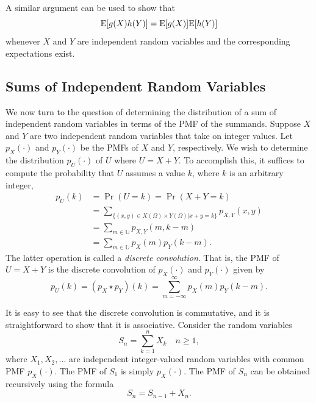 A similar argument can be used to show that
\begin{equation} \label{equation:DiscreteProduct}
\mathrm{E}[ g(X) h(Y) ] = \mathrm{E} [ g(X) ] \mathrm{E} [ h(Y) ]
\end{equation}
whenever $X$ and $Y$ are independent random variables and the corresponding expectations exist.


\subsection{Sums of Independent Random Variables}

We now turn to the question of determining the distribution of a sum of independent random variables in terms of the PMF of the summands.
Suppose $X$ and $Y$ are two independent random variables that take on integer values.
Let $p_X(\cdot)$ and $p_Y(\cdot)$ be the PMFs of $X$ and $Y$, respectively.
We wish to determine the distribution $p_U (\cdot)$ of $U$ where $U = X + Y$.
To accomplish this, it suffices to compute the probability that $U$ assumes a value $k$, where $k$ is an arbitrary integer,
\begin{equation*}
\begin{split}
p_U (k) &= \Pr (U = k) = \Pr (X + Y = k) \\
&= \sum_{ \{ (x,y) \in X(\Omega) \times Y(\Omega) | x + y = k \} } p_{X,Y} (x, y) \\
&= \sum_{ m \in \mathbb{U} } p_{X,Y} (m, k-m) \\
&= \sum_{ m \in \mathbb{U} } p_X (m) p_Y(k-m) .
\end{split}
\end{equation*}
The latter operation is called a \emph{discrete convolution}. 
That is, the PMF of $U = X + Y$ is the discrete convolution of $p_X (\cdot)$ and $p_Y (\cdot)$ given by
\begin{equation} \label{equation:DiscreteConvolution}
p_U(k) = (p_X \star p_Y)(k)
= \sum_{m = - \infty}^{\infty} p_X(m) p_Y(k-m) .
\end{equation}

It is easy to see that the discrete convolution is commutative, and it is straightforward to show that it is associative.
Consider the random variables
\begin{equation*}
S_n = \sum_{k=1}^n X_k \quad n \geq 1 ,
\end{equation*}
where $X_1, X_2, \ldots$ are independent integer-valued random variables with common PMF $p_X (\cdot)$.
The PMF of $S_1$ is simply $p_X (\cdot)$.
The PMF of $S_n$ can be obtained recursively using the formula
\begin{equation*}
S_n = S_{n-1} + X_n .
\end{equation*}


